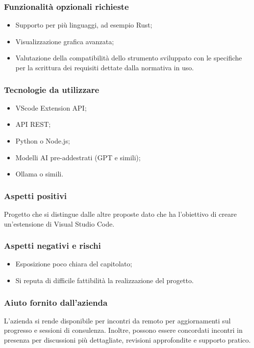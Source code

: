 \documentclass[10pt]{article}
\begin{document}
\subsubsection{Funzionalità opzionali richieste}
\begin{itemize}
    \item Supporto per più linguaggi, ad esempio Rust;
    \item Visualizzazione grafica avanzata;
    \item Valutazione della compatibilità dello strumento sviluppato con le specifiche per la scrittura dei requisiti dettate dalla normativa in uso.
\end{itemize}
\subsubsection{Tecnologie da utilizzare}
\begin{itemize}
    \item VScode Extension API;
    \item API REST;
    \item Python o Node.js;
    \item Modelli AI pre-addestrati (GPT e simili);
    \item Ollama o simili.
\end{itemize}
\subsubsection{Aspetti positivi}
Progetto che si distingue dalle altre proposte dato che ha l'obiettivo di creare un'estensione di Visual Studio Code.
\subsubsection{Aspetti negativi e rischi}
\begin{itemize}
    \item Esposizione poco chiara del capitolato;
    \item Si reputa di difficile fattibilità la realizzazione del progetto.
\end{itemize}
\subsubsection{Aiuto fornito dall'azienda}
L'azienda si rende disponibile per incontri da remoto per aggiornamenti sul progresso e sessioni di consulenza. Inoltre, possono essere concordati incontri in presenza per discussioni più dettagliate, revisioni approfondite e supporto pratico.
\end{document}
